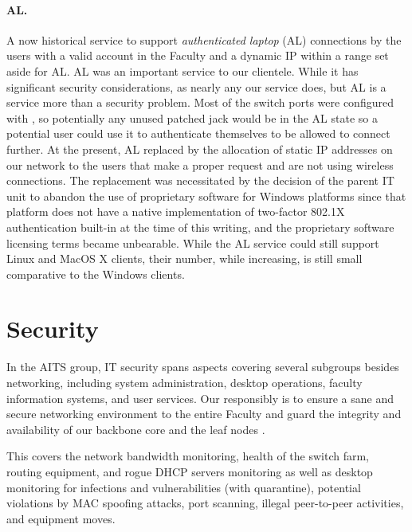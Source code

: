 \paragraph{AL.}
\label{sect:al}

A now historical service to support {\em authenticated laptop} (AL) connections
by the users with a valid account in the Faculty and a dynamic IP within
a range set aside for AL.
AL was an important service to our clientele.  While it
has significant security considerations, as nearly any our service does, but
AL is a service more than a security problem.
Most of the switch ports were configured with , so potentially
any unused patched jack would be in the AL state so a potential user
could use it to authenticate themselves to be allowed to connect further.
At the present, AL replaced by the allocation of static IP addresses on
our network to the users that make a proper request and are not using
wireless connections. The replacement was necessitated by the decision of
the parent IT unit to abandon the use of proprietary software for Windows
platforms since that platform does not have a native implementation
of two-factor 802.1X authentication built-in at the time of this writing,
and the proprietary software licensing terms became unbearable. While
the AL service could still support Linux and MacOS X clients, their number,
while increasing, is still small comparative to the Windows clients.




\section{Security}
\label{sect:security}

In the AITS group, IT security spans aspects covering several subgroups besides networking, including
system administration, desktop operations, faculty information systems, and user
services. Our responsibly is to ensure a sane and secure networking environment
to the entire Faculty and guard the integrity and availability of our backbone
core and the leaf nodes
\cite{tao-net-sec-2005,conu-sec-anne-mja-1995,pervasive-trust-ngns,rubin-white-hat-arsenal-2001}.

This covers the network bandwidth monitoring, health of the switch farm, routing
equipment, and rogue DHCP servers monitoring as well as desktop monitoring for
infections and vulnerabilities (with quarantine), potential violations by
MAC spoofing attacks, port scanning, illegal peer-to-peer activities,
and equipment moves.


